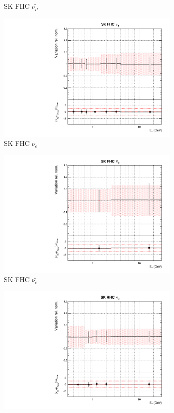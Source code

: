 \begin{figure}
\begin{subfigure}{0.24\textwidth}
  \caption{SK FHC $\bar{\nu_{\mu}}$}
\end{subfigure}
\begin{subfigure}{0.24\textwidth}
  \centering
  \includegraphics[width=0.95\linewidth]{figs/asmvflux10}
  \caption{SK FHC $\nu_{e}$}
\end{subfigure}
\begin{subfigure}{0.24\textwidth}
  \centering
  \includegraphics[width=0.95\linewidth]{figs/asmvflux11}
  \caption{SK FHC $\bar{\nu_{e}}$}
\end{subfigure}
\begin{subfigure}{0.24\textwidth}
  \centering
  \includegraphics[width=0.95\linewidth]{figs/asmvflux12}

\end{subfigure}
\end{figure}
